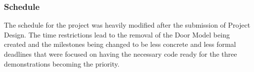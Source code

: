 \subsubsection{Schedule}
The schedule for the project was heavily modified after the submission of Project Design. The time restrictions lead to the removal of the Door Model being created and the milestones being changed to be less concrete and less formal deadlines that were focused on having the necessary code ready for the three demonstrations becoming the priority.
